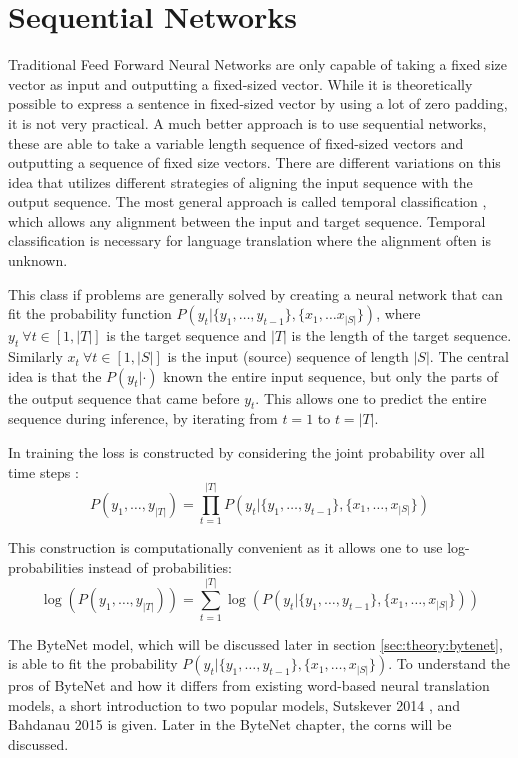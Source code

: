 \section{Sequential Networks}

Traditional Feed Forward Neural Networks are only capable of taking a fixed size vector as input and outputting a fixed-sized vector. While it is theoretically possible to express a sentence in fixed-sized vector by using a lot of zero padding, it is not very practical. A much better approach is to use sequential networks, these are able to take a variable length sequence of fixed-sized vectors and outputting a sequence of fixed size vectors. There are different variations on this idea that utilizes different strategies of aligning the input sequence with the output sequence. The most general approach is called temporal classification \cite{alexgraves}, which allows any alignment between the input and target sequence. Temporal classification is necessary for language translation where the alignment often is unknown.

This class if problems are generally solved by creating a neural network that can fit the probability function $P(y_t | \{y_1, \dots, y_{t-1}\}, \{x_1, \dots x_{|S|}\})$, where $y_t\ \forall t \in [1, |T|]$ is the target sequence and $|T|$ is the length of the target sequence. Similarly $x_t\ \forall t \in [1, |S|]$ is the input (source) sequence of length $|S|$. The central idea is that the $P(y_t| \cdot)$ known the entire input sequence, but only the parts of the output sequence that came before $y_t$. This allows one to predict the entire sequence during inference, by iterating from $t = 1$ to $t = |T|$.

In training the loss is constructed by considering the joint probability over all time steps \cite{alexgraves}:
\begin{equation}
P(y_1, \dots, y_{|T|}) = \prod_{t=1}^{|T|} P(y_t | \{y_1, \dots, y_{t-1}\}, \{x_1, \dots, x_{|S|}\})
\end{equation}

This construction is computationally convenient as it allows one to use log-probabilities instead of probabilities:
\begin{equation}
\log(P(y_1, \dots, y_{|T|})) = \sum_{t=1}^{|T|} \log(P(y_t | \{y_1, \dots, y_{t-1}\}, \{x_1, \dots, x_{|S|}\}))
\end{equation}

The ByteNet model, which will be discussed later in section \ref{sec:theory:bytenet}, is able to fit the probability $P(y_t | \{y_1, \dots, y_{t-1}\}, \{x_1, \dots, x_{|S|}\})$. To understand the pros of ByteNet and how it differs from existing word-based neural translation models, a short introduction to two popular models, Sutskever 2014 \cite{sutskever-2014-nmt}, and Bahdanau 2015 \cite{bahdanau-2015-nmt} is given. Later in the ByteNet chapter, the corns will be discussed.

